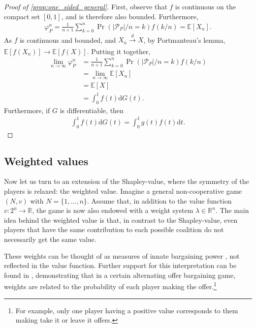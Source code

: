 \documentclass[a4paper]{article}
\newcommand{\dt}{\mathrm{d}t}
\newcommand{\E}{\mathbb{E}}
\begin{document}
\begin{proof}[Proof of \cref{prop:one_sided_general}]
    First, observe that $f$ is continuous on the compact set $[0, 1]$, and is therefore also bounded.
    Furthermore,
    \begin{align*}
        \varphi_P^n = \frac{1}{n+1} \sum_{k=0}^n \Pr(|\mathcal{P}_P| / n = k) f(k/n) = \E[X_n].
    \end{align*}
    As $f$ is continuous and bounded, and $X_n \xrightarrow[]{d} X$, by Portmanteau's lemma, $\E[f(X_n)] \to \E[f(X)]$.
    Putting it together,
    \begin{align*}
        \lim_{n \to \infty} \varphi_P^n &= \frac{1}{n+1} \sum_{k=0}^n \Pr(|\mathcal{P}_P| / n = k) f(k/n) \\
        &= \lim_{n \to \infty} \E[X_n] \\
        &= \E[X] \\
        &= \int_0^1 f(t) \mathrm{d}G(t).
    \end{align*}
    Furthermore, if $G$ is differentiable, then
    \begin{align*}
        \int_0^1 f(t) \mathrm{d}G(t) = \int_0^1 g(t) f(t) \dt.
    \end{align*}
\end{proof}


\subsection{Weighted values}

Now let us turn to an extension of the Shapley-value, where the symmetry of the players is relaxed: the weighted value.
Imagine a general non-cooperative game $(N, v)$ with $N = \{1, \dots, n\}$.
Assume that, in addition to the value function $v : 2^n \to \mathbb{R}$, the game is now also endowed with a weight system $\lambda \in \mathbb{R}^n$.
The main idea behind the weighted value is that, in contrast to the Shapley-value, even players that have the same contribution to each possible coalition do not necessarily get the same value.

These weights can be thought of as measures of innate bargaining power \parencite{shapley1953additive}, not reflected in the value function.
Further support for this interpretation can be found in \textcite{hart1996bargaining}, demonstrating that in a certain alternating offer bargaining game, weights are related to the probability of each player making the offer.\footnote{
    For example, only one player having a positive value corresponds to them making take it or leave it offers.
}
\end{document}
